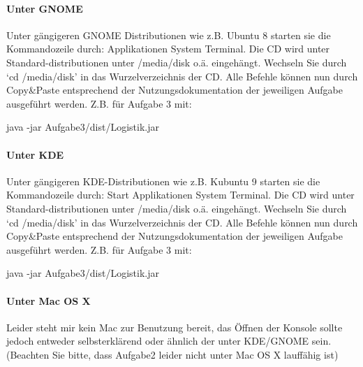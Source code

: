\documentclass[a4paper,11pt]{scrartcl}
\begin{document}
\paragraph{Unter GNOME}
Unter gängigeren GNOME Distributionen wie z.B. Ubuntu 8 starten sie die Kommandozeile durch:
Applikationen \then System \then Terminal.
Die CD wird unter Standard-distributionen unter /media/disk o.ä. eingehängt. Wechseln Sie durch `cd /media/disk' in das Wurzelverzeichnis der CD.
Alle Befehle können nun durch Copy\&Paste entsprechend der Nutzungsdokumentation der jeweiligen Aufgabe ausgeführt werden. Z.B. für Aufgabe 3 mit:
\begin{center} java -jar Aufgabe3/dist/Logistik.jar \end{center}
\paragraph{Unter KDE}
Unter gängigeren KDE-Distributionen wie z.B. Kubuntu 9 starten sie die Kommandozeile durch:
Start \then Applikationen \then System \then Terminal.
Die CD wird unter Standard-distributionen unter /media/disk o.ä. eingehängt. Wechseln Sie durch `cd /media/disk' in das Wurzelverzeichnis der CD.
Alle Befehle können nun durch Copy\&Paste entsprechend der Nutzungsdokumentation der jeweiligen Aufgabe ausgeführt werden. Z.B. für Aufgabe 3 mit:
\begin{center} java -jar Aufgabe3/dist/Logistik.jar \end{center}
\paragraph{Unter Mac OS X}
Leider steht mir kein Mac zur Benutzung bereit, das Öffnen der Konsole sollte jedoch entweder selbsterklärend oder
ähnlich der unter KDE/GNOME sein. (Beachten Sie bitte, dass Aufgabe2 leider nicht unter Mac OS X lauffähig ist)
\end{document}
